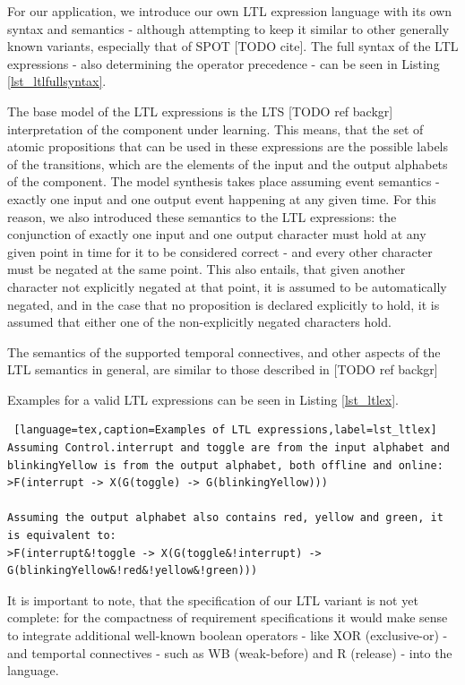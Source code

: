 For our application, we introduce our own LTL expression language with its own syntax and semantics - although attempting to keep it similar to other generally known variants, especially that of SPOT [TODO cite]. The full syntax of the LTL expressions - also determining the operator precedence - can be seen in Listing \ref{lst_ltlfullsyntax}.

The base model of the LTL expressions is the LTS [TODO ref backgr] interpretation of the component under learning. This means, that the set of atomic propositions that can be used in these expressions are the possible labels of the transitions, which are the elements of the input and the output alphabets of the component. The model synthesis takes place assuming event semantics - exactly one input and one output event happening at any given time. For this reason, we also introduced these semantics to the LTL expressions: the conjunction of exactly one input and one output character must hold at any given point in time for it to be considered correct - and every other character must be negated at the same point. This also entails, that given another character not explicitly negated at that point, it is assumed to be automatically negated, and in the case that no proposition is declared explicitly to hold, it is assumed that either one of the non-explicitly negated characters hold. 

The semantics of the supported temporal connectives, and other aspects of the LTL semantics in general, are similar to those described in [TODO ref backgr] %

Examples for a valid LTL expressions can be seen in Listing \ref{lst_ltlex}.

\bigskip
\begin{lstlisting} [language=tex,caption=Examples of LTL expressions,label=lst_ltlex]
Assuming Control.interrupt and toggle are from the input alphabet and blinkingYellow is from the output alphabet, both offline and online:
>F(interrupt -> X(G(toggle) -> G(blinkingYellow)))

Assuming the output alphabet also contains red, yellow and green, it is equivalent to:
>F(interrupt&!toggle -> X(G(toggle&!interrupt) -> G(blinkingYellow&!red&!yellow&!green)))
\end{lstlisting}

It is important to note, that the specification of our LTL variant is not yet complete: for the compactness of requirement specifications it would make sense to integrate additional well-known boolean operators - like XOR (exclusive-or) - and temportal connectives - such as WB (weak-before) and R (release) - into the language. 

